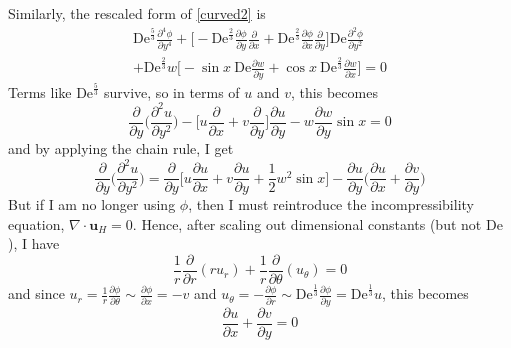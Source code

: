 \documentclass[10pt,a4paper]{report}
\begin{document}
Similarly, the rescaled form of \eqref{curved2} is
\begin{multline*}
\textrm{De}^{\frac{5}{3}} \frac{\partial^4 \phi}{\partial y^4} + \bigg[- \textrm{De}^{\frac{2}{3}} \frac{\partial \phi}{\partial y} \frac{\partial}{\partial x} + \textrm{De}^{\frac{2}{3}} \frac{\partial \phi}{\partial x} \frac{\partial}{\partial y} \bigg] \textrm{De} \frac{\partial^2 \phi}{\partial y^2} \\
+ \textrm{De}^{\frac{2}{3}} w \bigg[- \sin x \ \textrm{De} \frac{\partial w}{\partial y} + \cos x \ \textrm{De}^{\frac{2}{3}} \frac{\partial w}{\partial x} \bigg] = 0
\end{multline*}
Terms like $\textrm{De}^{\frac{5}{3}}$ survive, so in terms of $u$ and $v$, this becomes
\begin{equation*}
\frac{\partial}{\partial y} \bigg(\frac{\partial^2 u}{\partial y^2} \bigg) - \bigg[u \frac{\partial}{\partial x} + v \frac{\partial}{\partial y} \bigg] \frac{\partial u}{\partial y} - w \frac{\partial w}{\partial y} \sin x = 0
\end{equation*}
and by applying the chain rule, I get
\begin{equation}\label{preboundary2}
\frac{\partial}{\partial y} \bigg(\frac{\partial^2 u}{\partial y^2} \bigg) = \frac{\partial}{\partial y} \bigg[u \frac{\partial u}{\partial x} + v \frac{\partial u}{\partial y} + \frac{1}{2} w^2 \sin x \bigg] - \frac{\partial u}{\partial y} \bigg(\frac{\partial u}{\partial x} + \frac{\partial v}{\partial y} \bigg)
\end{equation}
But if I am no longer using $\phi$, then I must reintroduce the incompressibility equation, $\nabla \cdot \bm{u}_H = 0$. Hence, after scaling out dimensional constants (but not $\textrm{De}$), I have
\begin{equation*}
\frac{1}{r} \frac{\partial}{\partial r} (r u_r) + \frac{1}{r} \frac{\partial}{\partial \theta}(u_\theta) = 0
\end{equation*}
and since $u_r = \frac{1}{r} \frac{\partial \phi}{\partial \theta} \sim \frac{\partial \phi}{\partial x} = -v$ and $u_\theta = -\frac{\partial \phi}{\partial r} \sim \textrm{De}^{\frac{1}{3}} \frac{\partial \phi}{\partial y} = \textrm{De}^{\frac{1}{3}} u$, this becomes
\begin{equation*}
\frac{\partial u}{\partial x} + \frac{\partial v}{\partial y} = 0
\end{equation*}
\end{document}
